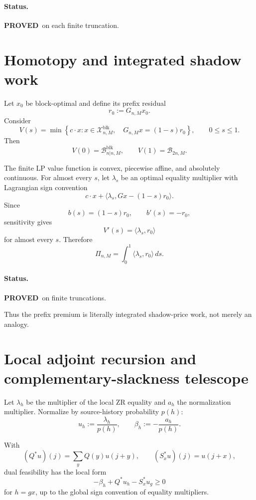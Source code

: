\documentclass[11pt,a4paper]{article}
\newcommand{\Bcal}{\mathcal B}
\newcommand{\Xcal}{\mathcal X}
\newcommand{\blk}{\mathrm{blk}}
\newcommand{\PROVED}{\textcolor{green!45!black}{\textbf{PROVED}}}
\begin{document}
\paragraph{Status.}
\PROVED\ on each finite truncation.

\section{Homotopy and integrated shadow work}

Let \(x_0\) be block-optimal and define its prefix residual
\[
r_0:=G_{n,M}x_0.
\]
Consider
\[
V(s)
=
\min\left\{
c\cdot x:
x\in\Xcal^{\blk}_{n,M},
\quad
G_{n,M}x=(1-s)r_0
\right\},
\qquad
0\le s\le1.
\]
Then
\[
V(0)=\Bcal^{\blk}_{n|n,M},
\qquad
V(1)=\Bcal_{2n,M}.
\]

The finite LP value function is convex, piecewise affine, and absolutely
continuous.
For almost every \(s\), let \(\lambda_s\) be an optimal equality multiplier
with Lagrangian sign convention
\[
c\cdot x
+
\langle\lambda_s,Gx-(1-s)r_0\rangle.
\]
Since
\[
b(s)=(1-s)r_0,
\qquad
b'(s)=-r_0,
\]
sensitivity gives
\[
V'(s)=\langle\lambda_s,r_0\rangle
\]
for almost every \(s\).
Therefore
\begin{equation}
\boxed{
\Pi_{n,M}
=
\int_0^1
\langle\lambda_s,r_0\rangle\,ds.
}
\tag{14}
\end{equation}

\paragraph{Status.}
\PROVED\ on finite truncations.

Thus the prefix premium is literally integrated shadow-price work, not merely
an analogy.

\section{Local adjoint recursion and complementary-slackness telescope}

Let \(\lambda_h\) be the multiplier of the local ZR equality and \(a_h\) the
normalization multiplier.
Normalize by source-history probability \(p(h)\):
\[
u_h:=\frac{\lambda_h}{p(h)},
\qquad
\beta_h:=-\frac{a_h}{p(h)}.
\]

With
\[
(Q^*u)(j)=\sum_yQ(y)u(j+y),
\qquad
(S_x^*u)(j)=u(j+x),
\]
dual feasibility has the local form
\[
\boxed{
-\beta_h+Q^*u_h-S_x^*u_g\ge0
}
\tag{15}
\]
for \(h=gx\), up to the global sign convention of equality multipliers.
\end{document}
